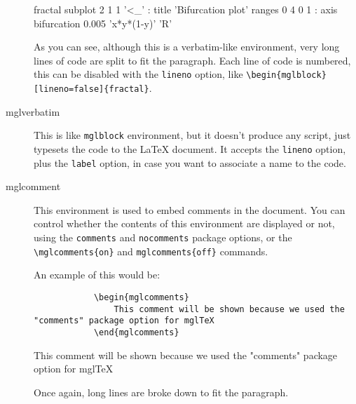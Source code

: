\documentclass{article}
\begin{document}
\begin{description}
\begin{mglblock}{fractal}
subplot 2 1 1 '<_' : title 'Bifurcation plot'
ranges 0 4 0 1 : axis
bifurcation 0.005 'x*y*(1-y)' 'R'
\end{mglblock}
		As you can see, although this is a verbatim-like environment, very long lines of code are split to fit the paragraph. Each line of code is numbered, this can be disabled with the \verb|lineno| option, like \verb|\begin{mglblock}[lineno=false]{fractal}|.
		
		\item[mglverbatim] This is like \verb|mglblock| environment, but it doesn't produce any script, just typesets the code to the \LaTeX{} document. It accepts the \verb|lineno| option, plus the \verb|label| option, in case you want to associate a name to the code.
		
		\item[mglcomment] This environment is used to embed comments in the document. You can control whether the contents of this environment are displayed or not, using the \verb|comments| and \verb|nocomments| package options, or the \verb|\mglcomments{on}| and \verb|mglcomments{off}| commands.
		
		An example of this would be:
		\begin{verbatim}
			\begin{mglcomments}
				This comment will be shown because we used the "comments" package option for mglTeX
			\end{mglcomments}
		\end{verbatim}
\begin{mglcomment}
This comment will be shown because we used the "comments" package option for mglTeX
\end{mglcomment}
		Once again, long lines are broke down to fit the paragraph.
	\end{description}
	
\end{document}
